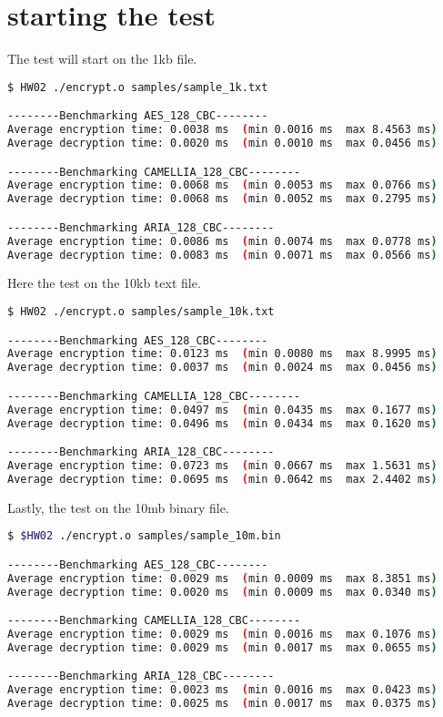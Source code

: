 \documentclass{article}
\begin{document}
\section{starting the test}
The test will start on the 1kb file.
\begin{lstlisting}[language=bash]
$ HW02 ./encrypt.o samples/sample_1k.txt     

--------Benchmarking AES_128_CBC--------
Average encryption time: 0.0038 ms  (min 0.0016 ms  max 8.4563 ms)
Average decryption time: 0.0020 ms  (min 0.0010 ms  max 0.0456 ms)

--------Benchmarking CAMELLIA_128_CBC--------
Average encryption time: 0.0068 ms  (min 0.0053 ms  max 0.0766 ms)
Average decryption time: 0.0068 ms  (min 0.0052 ms  max 0.2795 ms)

--------Benchmarking ARIA_128_CBC--------
Average encryption time: 0.0086 ms  (min 0.0074 ms  max 0.0778 ms)
Average decryption time: 0.0083 ms  (min 0.0071 ms  max 0.0566 ms)
\end{lstlisting}
Here the test on the 10kb text file.
\begin{lstlisting}[language=bash]
$ HW02 ./encrypt.o samples/sample_10k.txt

--------Benchmarking AES_128_CBC--------
Average encryption time: 0.0123 ms  (min 0.0080 ms  max 8.9995 ms)
Average decryption time: 0.0037 ms  (min 0.0024 ms  max 0.0456 ms)

--------Benchmarking CAMELLIA_128_CBC--------
Average encryption time: 0.0497 ms  (min 0.0435 ms  max 0.1677 ms)
Average decryption time: 0.0496 ms  (min 0.0434 ms  max 0.1620 ms)

--------Benchmarking ARIA_128_CBC--------
Average encryption time: 0.0723 ms  (min 0.0667 ms  max 1.5631 ms)
Average decryption time: 0.0695 ms  (min 0.0642 ms  max 2.4402 ms)
\end{lstlisting}
Lastly, the test on the 10mb binary file.
\begin{lstlisting}[language=bash]
$ $HW02 ./encrypt.o samples/sample_10m.bin

--------Benchmarking AES_128_CBC--------
Average encryption time: 0.0029 ms  (min 0.0009 ms  max 8.3851 ms)
Average decryption time: 0.0020 ms  (min 0.0009 ms  max 0.0340 ms)

--------Benchmarking CAMELLIA_128_CBC--------
Average encryption time: 0.0029 ms  (min 0.0016 ms  max 0.1076 ms)
Average decryption time: 0.0029 ms  (min 0.0017 ms  max 0.0655 ms)

--------Benchmarking ARIA_128_CBC--------
Average encryption time: 0.0023 ms  (min 0.0016 ms  max 0.0423 ms)
Average decryption time: 0.0025 ms  (min 0.0017 ms  max 0.0375 ms)
\end{lstlisting}
\end{document}
